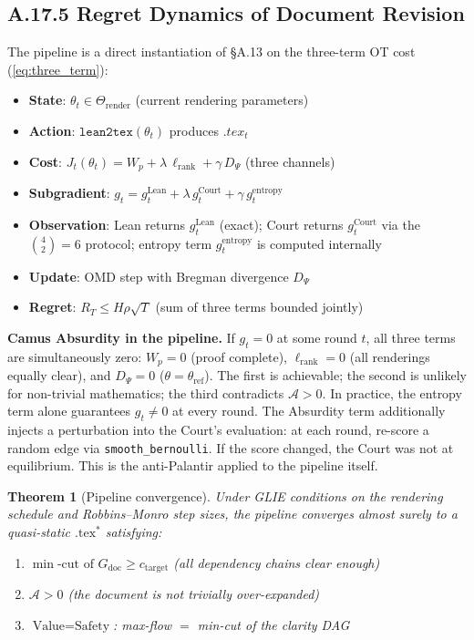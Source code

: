 \documentclass[11pt,a4paper]{article}
\newtheorem{theorem}{Theorem}[section]
\theoremstyle{definition}
\theoremstyle{remark}
\begin{document}
\subsection{A.17.5 Regret Dynamics of Document Revision}

The pipeline is a direct instantiation of \S A.13 on the three-term OT cost (\ref{eq:three_term}):

\begin{itemize}[nosep]
  \item \textbf{State}: $\theta_t \in \Theta_{\mathrm{render}}$ (current rendering parameters)
  \item \textbf{Action}: $\texttt{lean2tex}(\theta_t)$ produces $.tex_t$
  \item \textbf{Cost}: $J_t(\theta_t) = W_p + \lambda\, \ell_{\mathrm{rank}} + \gamma\, D_\Psi$ (three channels)
  \item \textbf{Subgradient}: $g_t = g_t^{\mathrm{Lean}} + \lambda\, g_t^{\mathrm{Court}} + \gamma\, g_t^{\mathrm{entropy}}$
  \item \textbf{Observation}: Lean returns $g_t^{\mathrm{Lean}}$ (exact); Court returns $g_t^{\mathrm{Court}}$ via the $\binom{4}{2} = 6$ protocol; entropy term $g_t^{\mathrm{entropy}}$ is computed internally
  \item \textbf{Update}: OMD step with Bregman divergence $D_\Psi$
  \item \textbf{Regret}: $R_T \leq H\rho\sqrt{T}$ (sum of three terms bounded jointly)
\end{itemize}

\textbf{Camus Absurdity in the pipeline.} If $g_t = 0$ at some round $t$, all three terms are simultaneously zero: $W_p = 0$ (proof complete), $\ell_{\mathrm{rank}} = 0$ (all renderings equally clear), and $D_\Psi = 0$ ($\theta = \theta_{\mathrm{ref}}$). The first is achievable; the second is unlikely for non-trivial mathematics; the third contradicts $\mathcal{A} > 0$. In practice, the entropy term alone guarantees $g_t \neq 0$ at every round. The Absurdity term additionally injects a perturbation into the Court's evaluation: at each round, re-score a random edge via \texttt{smooth\_bernoulli}. If the score changed, the Court was not at equilibrium. This is the anti-Palantir applied to the pipeline itself.

\begin{theorem}[Pipeline convergence]\label{thm:pipeline_conv}
Under GLIE conditions on the rendering schedule and Robbins--Monro step sizes, the pipeline converges almost surely to a quasi-static $\text{.tex}^*$ satisfying:
\begin{enumerate}[nosep]
  \item[(i)] $\min\text{-cut of } G_{\mathrm{doc}} \geq c_{\mathrm{target}}$ \quad (all dependency chains clear enough)
  \item[(ii)] $\mathcal{A} > 0$ \quad (the document is not trivially over-expanded)
  \item[(iii)] $\text{Value} = \text{Safety}$: max-flow $=$ min-cut of the clarity DAG
\end{enumerate}
\end{theorem}
\end{document}
